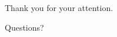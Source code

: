 \documentclass[
  aspectratio=169,
]{beamer}
\begin{document}
\section{\bibname}
\begin{frame}[t, allowframebreaks]{\bibname}
\printbibliography[heading=none]
\end{frame}

\begin{frame}[plain]
\begin{center}
\Huge Thank you for your attention.

\vspace{1cm}
\large Questions?
\end{center}
\end{frame}
\end{document}
